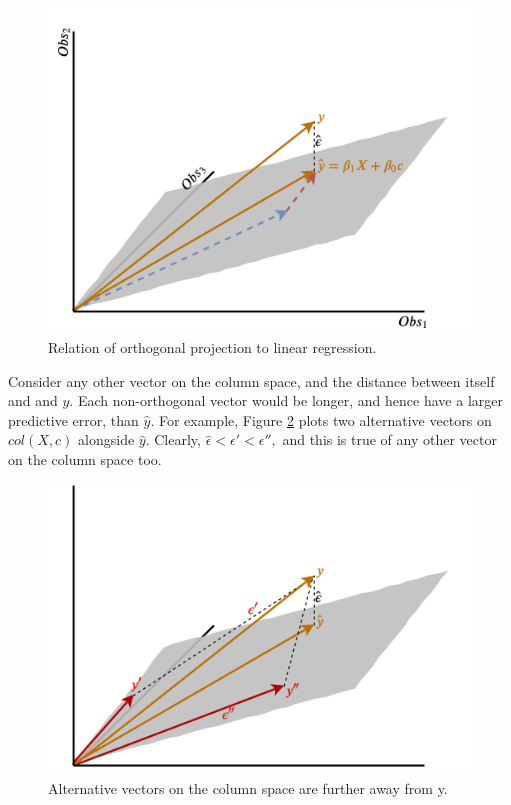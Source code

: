 \documentclass[
]{book}
\begin{document}
\begin{figure}
\includegraphics[width=1\linewidth]{images/lp_solve2} \caption{Relation of orthogonal projection to linear regression.}\label{fig:lp-demo2}
\end{figure}

Consider any other vector on the column space, and the distance between itself and and \(y\). Each non-orthogonal vector would be longer, and hence have a larger predictive error, than \(\hat{y}\). For example, Figure \ref{fig:lp-distances} plots two alternative vectors on \(col(X,c)\) alongside \(\hat{y}\). Clearly, \(\hat{\epsilon} < \epsilon' < \epsilon'',\) and this is true of any other vector on the column space too.

\begin{figure}
\includegraphics[width=1\linewidth]{images/lp_distances} \caption{Alternative vectors on the column space are further away from y.}\label{fig:lp-distances}
\end{figure}
\end{document}
